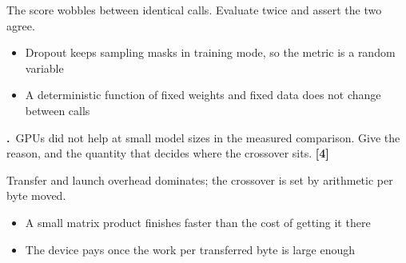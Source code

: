 \documentclass[11pt,a4paper]{article}
\newcounter{exq}[section]
\newcommand{\question}[2]{%
  \refstepcounter{exq}%
  \medskip
  \noindent
  \begin{minipage}{\textwidth}
    \textbf{\theexq.}~#1 \hfill{\color{aimlmuted}\textbf{[#2]}}
  \end{minipage}\par}
\begin{document}
\begin{solution}[title={Solution}]
The score wobbles between identical calls. Evaluate twice and assert the two agree.
\begin{itemize}[leftmargin=*,nosep]
  \item Dropout keeps sampling masks in training mode, so the metric is a random variable
  \item A deterministic function of fixed weights and fixed data does not change between calls
\end{itemize}
\end{solution}
\question{GPUs did not help at small model sizes in the measured comparison. Give the reason, and the quantity that decides where the crossover sits.}{4}
\begin{solution}[title={Solution}]
Transfer and launch overhead dominates; the crossover is set by arithmetic per byte moved.
\begin{itemize}[leftmargin=*,nosep]
  \item A small matrix product finishes faster than the cost of getting it there
  \item The device pays once the work per transferred byte is large enough
\end{itemize}
\end{solution}
\end{document}
